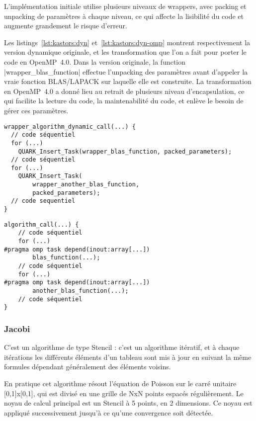 L'implémentation initiale utilise plusieurs niveaux de wrappers, avec packing et unpacking de paramètres à chaque niveau, ce qui affecte la lisibilité du code et augmente grandement le risque d'erreur.

Les listings~\ref{lst:kastors:dyn} et~\ref{lst:kastors:dyn-omp} montrent respectivement la version dynamique originale, et les transformation que l'on a fait pour porter le code en OpenMP~4.0.
Dans la version originale, la function |wrapper_blas_function| effectue l'unpacking des paramètres avant d'appeler la vraie fonction BLAS/LAPACK sur laquelle elle est construite.
La transformation en OpenMP~4.0 a donné lieu au retrait de plusieurs niveau d'encapsulation, ce qui facilite la lecture du code, la maintenabilité du code, et enlève le besoin de gérer ces paramètres.

\begin{lstlisting}[caption=Format de l'algorithme dynamique,label=lst:kastors:dyn]
wrapper_algorithm_dynamic_call(...) {
  // code séquentiel
  for (...)
    QUARK_Insert_Task(wrapper_blas_function, packed_parameters);
  // code séquentiel
  for (...)
    QUARK_Insert_Task(
        wrapper_another_blas_function,
        packed_parameters);
  // code sequentiel
}
\end{lstlisting}
\begin{lstlisting}[caption=Format de l'algorithme OpenMP,label=lst:kastors:dyn-omp]
algorithm_call(...) {
    // code séquentiel
    for (...)
#pragma omp task depend(inout:array[...])
        blas_function(...);
    // code séquentiel
    for (...)
#pragma omp task depend(inout:array[...])
        another_blas_function(...);
    // code séquentiel
}
\end{lstlisting}


\subsubsection{Jacobi}

C'est un algorithme de type Stencil : c'est un algorithme itératif, et à chaque itérations les différents éléments d'un tableau sont mis à jour en suivant la même formules dépendant généralement des éléments voisins.

En pratique cet algorithme résout l'équation de Poisson sur le carré unitaire [0,1]x[0,1], qui est divisé en une grille de NxN points espacés régulièrement.
Le noyau de calcul principal est un Stencil à 5 points, en 2 dimensions.
Ce noyau est appliqué successivement jusqu'à ce qu'une convergence soit détectée.

